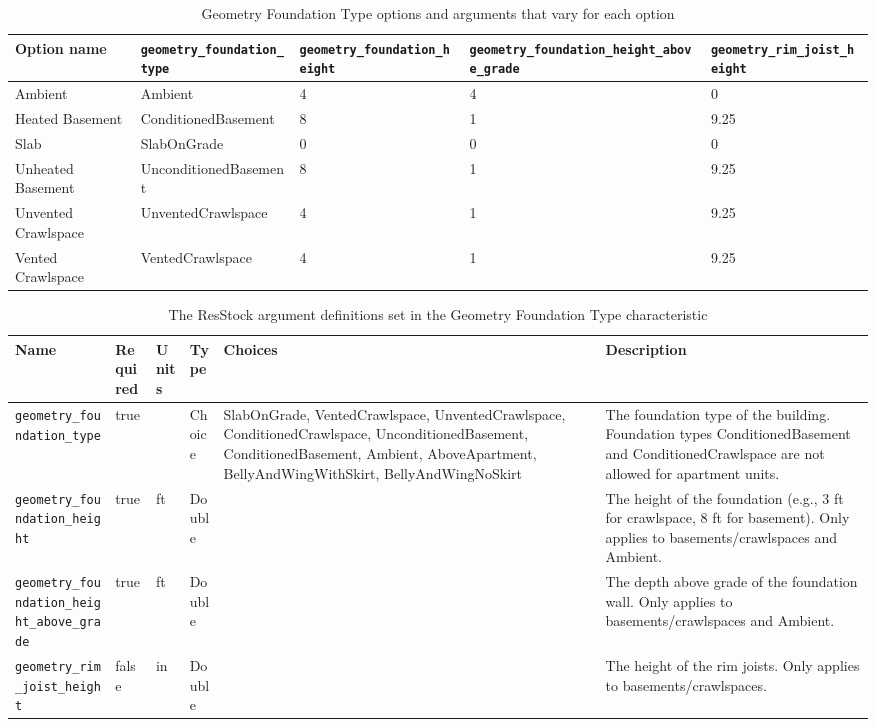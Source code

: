 \begin{longtable}[]{ |p{3.3cm}|p{3.5cm}|p{2.4cm}|p{2.4cm}|p{2.2cm}| }
\caption{Geometry Foundation Type options and arguments that vary for each option} \label{table:hc_opt_geom_found_type} \\
\toprule\noalign{}
Option name & \texttt{geometry\_foundation\_type} &
\texttt{geometry\_foundation\_height} &
\texttt{geometry\_foundation\_height\_above\_grade} &
\texttt{geometry\_rim\_joist\_height} \\
\midrule\noalign{}
\endhead
\bottomrule\noalign{}
\endlastfoot
Ambient & Ambient & 4 & 4 & 0 \\
\hline
Heated Basement & ConditionedBasement & 8 & 1 & 9.25 \\
\hline
Slab & SlabOnGrade & 0 & 0 & 0 \\
\hline
Unheated Basement & UnconditionedBasement & 8 & 1 & 9.25 \\
\hline
Unvented Crawlspace& UnventedCrawlspace & 4 & 1 & 9.25 \\
\hline
Vented Crawlspace & VentedCrawlspace & 4 & 1 & 9.25 \\
\end{longtable}

\begin{longtable}[]{ |p{}|p{1.5cm}|p{1cm}|p{1.1cm}|p{3.4cm}|p{4cm}| }
\caption{The ResStock argument definitions set in the Geometry Foundation Type characteristic} \label{table:hc_arg_def_geom_found_type}  \\
\toprule\noalign{}
Name & Required & Units & Type & Choices & Description \\
\midrule\noalign{}
\endhead
\bottomrule\noalign{}
\endlastfoot
\texttt{geometry\_foundation\_type} & true & & Choice & SlabOnGrade,
VentedCrawlspace, UnventedCrawlspace, ConditionedCrawlspace,
UnconditionedBasement, ConditionedBasement, Ambient, AboveApartment,
BellyAndWingWithSkirt, BellyAndWingNoSkirt & The foundation type of the
building. Foundation types ConditionedBasement and ConditionedCrawlspace
are not allowed for apartment units. \\
\hline
\texttt{geometry\_foundation\_height} & true & ft & Double & & The
height of the foundation (e.g., 3 ft for crawlspace, 8 ft for basement).
Only applies to basements/crawlspaces and Ambient. \\
\hline
\texttt{geometry\_foundation\_height\_above\_grade} & true & ft & Double
& & The depth above grade of the foundation wall. Only applies to
basements/crawlspaces and Ambient. \\
\hline
\texttt{geometry\_rim\_joist\_height} & false & in & Double & & The
height of the rim joists. Only applies to basements/crawlspaces. \\
\end{longtable}

